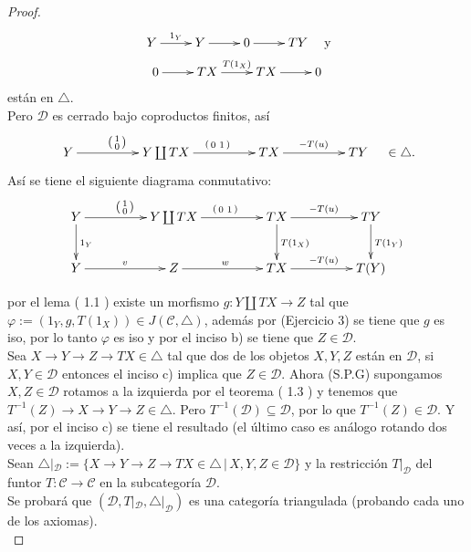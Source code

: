 \documentclass{article}
\newcommand{\spmat}[1]{%
  \left(\begin{smallmatrix}#1\end{smallmatrix}\right)%
}
\begin{document}
\begin{enumerate}
\begin{proof}
\begin{gather*}
\xymatrix{Y\ar[r]^{1_Y}&Y\ar[r]&0\ar[r]&TY}\quad \text{y}\\
\xymatrix{0\ar[r]&TX\ar[r]^{T(1_{X})}&TX\ar[r]&0}
\end{gather*}
están en $\triangle$.\\

Pero $\mathscr{D}$ es cerrado bajo coproductos finitos, así 
\begin{equation*}
\xymatrix@C+2pc{Y\ar[r]^{\spmat{1 \\ 0}} & Y\coprod TX\ar[r]^{\spmat{ 0 & 1}} & TX\ar[r]^{-T(u)} & TY}\quad \in \triangle .
\end{equation*}
Así se tiene el siguiente diagrama conmutativo:\\


\begin{equation*}
\xymatrix@C+2pc{Y\ar[r]^{\spmat{1 \\ 0}}\ar[d]^{1_Y} & Y\coprod TX\ar[r]^{\spmat{ 0 & 1}} & TX\ar[d]^{T(1_X)}\ar[r]^{-T(u)} 
& TY\ar[d]^{T(1_Y)}\\
Y\ar[r]^v & Z\ar[r]^w & TX\ar[r]^{-T(u)} & T(Y)}
\end{equation*}

por el lema ( 1.1 ) existe un morfismo $g:Y\coprod TX\longrightarrow Z$ tal que \\$\varphi:=(1_Y,g,T(1_X))\in J(\mathscr{C},\triangle)$, además por
 (Ejercicio 3) se tiene que $g$ es iso, por lo tanto $\varphi$ es iso y por el inciso b) se tiene que $Z\in \mathscr{D}$.\\

 Sea $X\to Y\to Z\to TX \in \triangle$ tal que dos de los objetos $X,Y,Z$ están en $\mathscr{D}$, si $X,Y\in \mathscr{D}$ entonces el 
inciso c) implica que $Z\in \mathscr{D}$. Ahora (S.P.G) supongamos $X,Z\in \mathscr{D}$ rotamos a la izquierda por el teorema ( 1.3 ) y tenemos 
que $T^{-1}(Z)\to X\to Y\to Z\in \triangle$. Pero $T^{-1}(\mathscr{D})\subseteq \mathscr{D}$, por lo que $T^{-1}(Z)\in \mathscr{D}$. 
Y así, por el inciso c) se tiene el resultado (el último caso es análogo rotando dos veces a la izquierda).\\

 Sean $\triangle|_{\mathscr{D}}:=\{X\to Y\to Z\to TX\in \triangle\,|\, X,Y,Z\in \mathscr{D}\}$ y la restricción $T|_{\mathscr{D}}$ del
funtor $T:\mathscr{C}\longrightarrow \mathscr{C}$ en la subcategoría $\mathscr{D}$.\\

Se probará que $(\mathscr{D},T|_{\mathscr{D}},\triangle|_{\mathscr{D}})$ es una categoría triangulada (probando cada uno de los axiomas).\\


\end{proof}
\end{enumerate}
\end{document}

